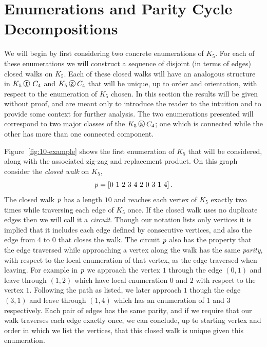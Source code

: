 \section{Enumerations and Parity Cycle Decompositions}
\label{sec:enum-parity-cycle}

We will begin by first considering two concrete enumerations of $K_5$. For each of these enumerations we will construct a sequence of disjoint (in terms of edges) closed walks on $K_5$. Each of these closed walks will have an analogous structure in $K_5 \replacement C_4$ and $K_5 \zigzag C_4$ that will be unique, up to order and orientation,  with respect to the enumeration of $K_5$ chosen. In this section the results will be given without proof, and are meant only to introduce the reader to the intuition and to provide some context for further analysis. The two enumerations presented will correspond to two major classes of the $K_5 \zigzag C_4$; one which is connected while the other has more than one connected component.

Figure~\ref{fig:10-example} shows the first enumeration of  $K_5$ that will be considered, along with the associated zig-zag and replacement product.  On this graph consider the {\em closed walk} on $K_5$, \[ \ppath = \left[  0\ 1\ 2\ 3\ 4\ 2\ 0\ 3\ 1\ 4 \right].   \]  The closed walk $\operatorname{\mathit{p}}$ has a length $10$ and reaches each vertex of $K_5$ exactly two times while traversing each edge of $K_5$ once. If the closed walk uses no duplicate edges then we will call it  a {\em circuit}. Though our notation lists only vertices it is implied that it includes each edge defined by consecutive vertices, and also the edge from $4$ to $0$ that closes the walk. The circuit $\operatorname{\mathit{p}}$ also has the property that the edge traversed while approaching a vertex along the walk has the same {\em parity}, with respect to the local enumeration of that vertex,  as the edge traversed when leaving. For example in $\operatorname{\mathit{p}}$ we approach the vertex $1$ through the edge $(0,1)$ and leave through $(1,2)$ which have local enumeration $0$ and $2$ with respect to the vertex $1$. Following the path as listed, we later approach $1$ though the edge $(3,1)$ and leave through $(1,4)$ which has an enumeration of $1$ and $3$ respectively. Each pair of edges has the same parity, and if we require that our walk traverses each edge exactly once, we can conclude, up to starting vertex and order in which we list the vertices, that this closed walk is unique given this enumeration.  
   

